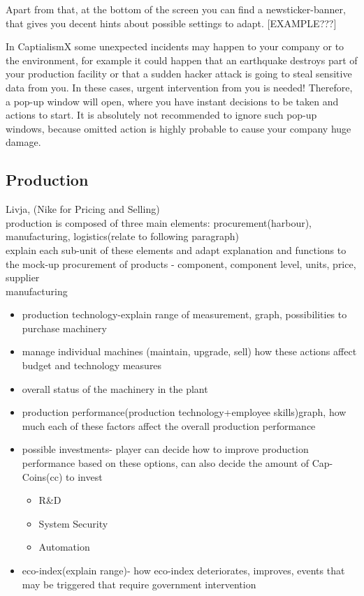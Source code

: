 \documentclass[11pt,titlepage,oneside,openany]{book}
\begin{document}
Apart from that, at the bottom of the screen you can find a newsticker-banner, that gives you decent hints about possible settings to adapt. [EXAMPLE???]%

In CaptialismX some unexpected incidents may happen to your company or to the environment, for example it could happen that an earthquake destroys part of your production facility or that a sudden hacker attack is going to steal sensitive data from you. In these cases, urgent intervention from you is needed! Therefore, a pop-up window will open, where you have instant decisions to be taken and actions to start. It is absolutely not recommended to ignore such pop-up windows, because omitted action is highly probable to cause your company huge damage.


 
 
%



\subsection{Production} \label{production_manual}
Livja, (Nike for Pricing and Selling) \\
 production is composed of three main elements: procurement(harbour), manufacturing, logistics(relate to following paragraph)\\
explain each sub-unit of these elements and adapt explanation and functions to the mock-up
procurement of products - component, component level, units, price, supplier \\
manufacturing
\begin{itemize} 
\item production technology-explain range of measurement, graph, possibilities to purchase machinery
\item manage individual machines (maintain, upgrade, sell) how these actions affect budget and technology measures
\item overall status of the machinery in the plant
\item production performance(production technology+employee skills)graph, how much each of these factors affect the overall production performance
 \item possible investments- player can decide how to improve production performance based on these options, can also decide the amount of Cap-Coins(cc) to invest
 \begin{itemize} 
 \item R\&D
 \item System Security
 \item Automation
 \end{itemize}
 \item eco-index(explain range)- how eco-index deteriorates, improves, events that may be triggered that require government intervention
\end{itemize}
\end{document}
